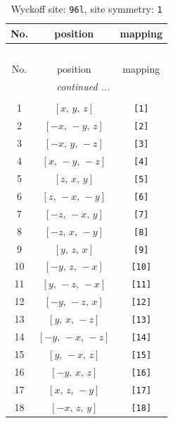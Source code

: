 \documentclass[fleqn,8pt]{jsarticle}
\begin{document}
\renewcommand{\arraystretch}{1.2}
\begin{longtable}{ccc}
\caption{Wyckoff site: {\tt 96l}, site symmetry: {\tt 1}}
 \\
 \hline \hline
No. & position & mapping \\ \hline \endfirsthead

\multicolumn{2}{l}{\tablename\ \thetable{}} \\
 \hline \hline
No. & position & mapping \\ \hline \endhead

 \hline \hline
\multicolumn{2}{r}{\footnotesize\it continued ...} \\ \endfoot

 \hline \hline
\multicolumn{2}{r}{} \\ \endlastfoot

1 & $\left[ x,\, y,\, z \right]$ & {\tt [1]} \\ \hline
2 & $\left[ - x,\, - y,\, z \right]$ & {\tt [2]} \\ \hline
3 & $\left[ - x,\, y,\, - z \right]$ & {\tt [3]} \\ \hline
4 & $\left[ x,\, - y,\, - z \right]$ & {\tt [4]} \\ \hline
5 & $\left[ z,\, x,\, y \right]$ & {\tt [5]} \\ \hline
6 & $\left[ z,\, - x,\, - y \right]$ & {\tt [6]} \\ \hline
7 & $\left[ - z,\, - x,\, y \right]$ & {\tt [7]} \\ \hline
8 & $\left[ - z,\, x,\, - y \right]$ & {\tt [8]} \\ \hline
9 & $\left[ y,\, z,\, x \right]$ & {\tt [9]} \\ \hline
10 & $\left[ - y,\, z,\, - x \right]$ & {\tt [10]} \\ \hline
11 & $\left[ y,\, - z,\, - x \right]$ & {\tt [11]} \\ \hline
12 & $\left[ - y,\, - z,\, x \right]$ & {\tt [12]} \\ \hline
13 & $\left[ y,\, x,\, - z \right]$ & {\tt [13]} \\ \hline
14 & $\left[ - y,\, - x,\, - z \right]$ & {\tt [14]} \\ \hline
15 & $\left[ y,\, - x,\, z \right]$ & {\tt [15]} \\ \hline
16 & $\left[ - y,\, x,\, z \right]$ & {\tt [16]} \\ \hline
17 & $\left[ x,\, z,\, - y \right]$ & {\tt [17]} \\ \hline
18 & $\left[ - x,\, z,\, y \right]$ & {\tt [18]} \\ \hline

\end{longtable}
\end{document}
